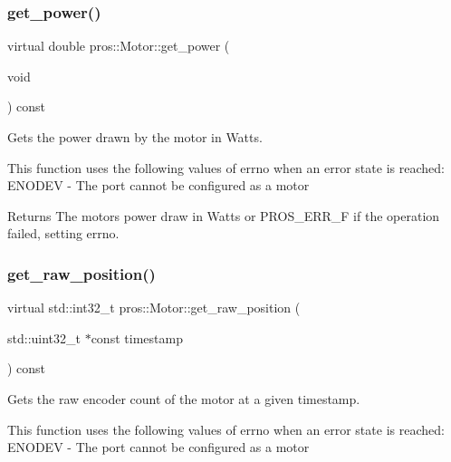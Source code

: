 \subsubsection{\texorpdfstring{get\+\_\+power()}{get\_power()}}
{\footnotesize\ttfamily virtual double pros\+::\+Motor\+::get\+\_\+power (\begin{DoxyParamCaption}\item[{void}]{ }\end{DoxyParamCaption}) const\hspace{0.3cm}{\ttfamily [virtual]}}



Gets the power drawn by the motor in Watts. 

This function uses the following values of errno when an error state is reached\+: E\+N\+O\+D\+EV -\/ The port cannot be configured as a motor

\begin{DoxyReturn}{Returns}
The motor\textquotesingle{}s power draw in Watts or P\+R\+O\+S\+\_\+\+E\+R\+R\+\_\+F if the operation failed, setting errno. 
\end{DoxyReturn}
\mbox{\label{classpros_1_1Motor_ae82c57d590e18d7d90afec1e9cc3bb4e}} 
\subsubsection{\texorpdfstring{get\+\_\+raw\+\_\+position()}{get\_raw\_position()}}
{\footnotesize\ttfamily virtual std\+::int32\+\_\+t pros\+::\+Motor\+::get\+\_\+raw\+\_\+position (\begin{DoxyParamCaption}\item[{std\+::uint32\+\_\+t $\ast$const}]{timestamp }\end{DoxyParamCaption}) const\hspace{0.3cm}{\ttfamily [virtual]}}



Gets the raw encoder count of the motor at a given timestamp. 

This function uses the following values of errno when an error state is reached\+: E\+N\+O\+D\+EV -\/ The port cannot be configured as a motor


